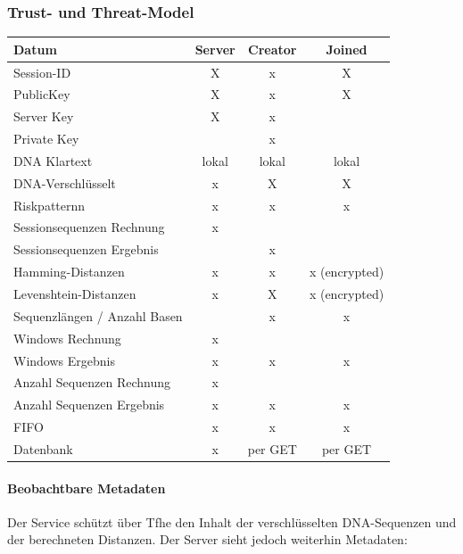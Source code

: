 \subsubsection{Trust- und Threat-Model}


\begin{longtable}{|p{5.2cm}|c|c|c|}
\hline
\textbf{Datum} & \textbf{Server } & \textbf{Creator} & \textbf{Joined} \\
\hline
\hline
Session-ID & X & x  & X \\
\hline
PublicKey & X & x & X \\
\hline
Server Key & X & x &  \\
\hline
Private Key &  & x &  \\
\hline
DNA Klartext & lokal & lokal & lokal \\
\hline
DNA-Verschlüsselt & x & X & X \\
\hline
Riskpatternn & x & x & x \\
\hline
Sessionsequenzen Rechnung & x &  &  \\
\hline
Sessionsequenzen Ergebnis &  & x &  \\
\hline
Hamming-Distanzen & x & x & x (encrypted) \\
\hline
Levenshtein-Distanzen & x & X & x (encrypted) \\
\hline
Sequenzlängen / Anzahl Basen &  & x & x \\
\hline
Windows Rechnung & x &  &  \\
\hline
Windows Ergebnis & x & x & x \\
\hline
Anzahl Sequenzen Rechnung & x &  &  \\
\hline
Anzahl Sequenzen Ergebnis & x & x & x \\
\hline
FIFO & x & x & x \\
\hline
Datenbank & x & per GET & per GET \\
\hline
\end{longtable}


\paragraph{Beobachtbare Metadaten}\label{beobachtbare-metadaten}

Der Service schützt über Tfhe den Inhalt der verschlüsselten DNA-Sequenzen und der berechneten Distanzen. Der Server sieht jedoch weiterhin Metadaten:

